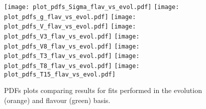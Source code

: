 \begin{figure}[t!]
    \begin{center}
        \texttt{[image: plot\_pdfs\_Sigma\_flav\_vs\_evol.pdf]}
        \texttt{[image: plot\_pdfs\_g\_flav\_vs\_evol.pdf]}
        \texttt{[image: plot\_pdfs\_V\_flav\_vs\_evol.pdf]}
        \texttt{[image: plot\_pdfs\_V3\_flav\_vs\_evol.pdf]}
        \texttt{[image: plot\_pdfs\_V8\_flav\_vs\_evol.pdf]}
        \texttt{[image: plot\_pdfs\_T3\_flav\_vs\_evol.pdf]}
        \texttt{[image: plot\_pdfs\_T8\_flav\_vs\_evol.pdf]}
        \texttt{[image: plot\_pdfs\_T15\_flav\_vs\_evol.pdf]}
        \caption{PDFs plots comparing results for fits performed in the evolution (orange) and flavour (green) basis.} 
        \label{fig:pdfs_plots_flav_vs_evol} 
    \end{center}
  \end{figure}



